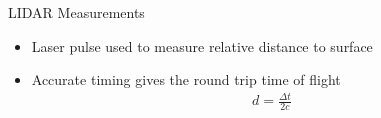 \begin{frame}{LIDAR Measurements }
    \begin{itemize}
        \item<1-> Laser pulse used to measure relative distance to surface
        \item<1-> Accurate timing gives the round trip time of flight
            \begin{align*}
                d = \frac{\Delta t}{2 c}
            \end{align*}
    \end{itemize}
     
    \begin{center}
    \end{center}
\end{frame}
